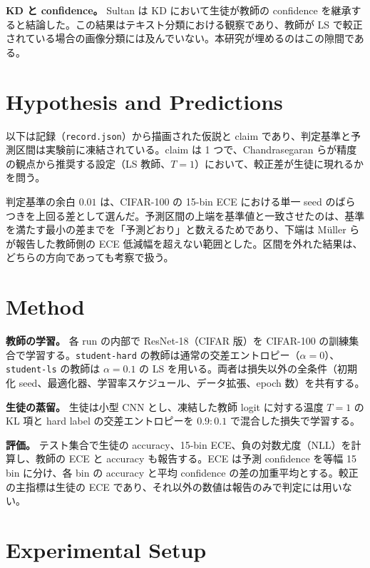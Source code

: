 \documentclass[journal,article,submit,moreauthors]{Definitions/mdpi}
\begin{document}
\textbf{KD と confidence。} Sultan は KD において生徒が教師の confidence を継承すると結論した\cite[s4.p1]{sultan-2023-knowledge}。この結果はテキスト分類における観察であり\cite[s4.p2]{sultan-2023-knowledge}、教師が LS で較正されている場合の画像分類には及んでいない。本研究が埋めるのはこの隙間である。

\section{Hypothesis and Predictions}
\label{sec:hypothesis}

以下は記録（\texttt{record.json}）から描画された仮説と claim であり、判定基準と予測区間は実験前に凍結されている。claim は 1 つで、Chandrasegaran らが精度の観点から推奨する設定（LS 教師、$T=1$）において、較正差が生徒に現れるかを問う。

判定基準の余白 $0.01$ は、CIFAR-100 の 15-bin ECE における単一 seed のばらつきを上回る差として選んだ。予測区間の上端を基準値と一致させたのは、基準を満たす最小の差までを「予測どおり」と数えるためであり、下端は Müller らが報告した教師側の ECE 低減幅を超えない範囲とした。区間を外れた結果は、どちらの方向であっても考察で扱う。



\section{Method}

\textbf{教師の学習。} 各 run の内部で ResNet-18（CIFAR 版）を CIFAR-100 の訓練集合で学習する。\texttt{student-hard} の教師は通常の交差エントロピー（$\alpha=0$）、\texttt{student-ls} の教師は $\alpha=0.1$ の LS を用いる。両者は損失以外の全条件（初期化 seed、最適化器、学習率スケジュール、データ拡張、epoch 数）を共有する。

\textbf{生徒の蒸留。} 生徒は小型 CNN とし、凍結した教師 logit に対する温度 $T=1$ の KL 項と hard label の交差エントロピーを $0.9:0.1$ で混合した損失で学習する。

\textbf{評価。} テスト集合で生徒の accuracy、15-bin ECE、負の対数尤度（NLL）を計算し、教師の ECE と accuracy も報告する。ECE は予測 confidence を等幅 15 bin に分け、各 bin の accuracy と平均 confidence の差の加重平均とする。較正の主指標は生徒の ECE であり、それ以外の数値は報告のみで判定には用いない。

\section{Experimental Setup}
\end{document}
